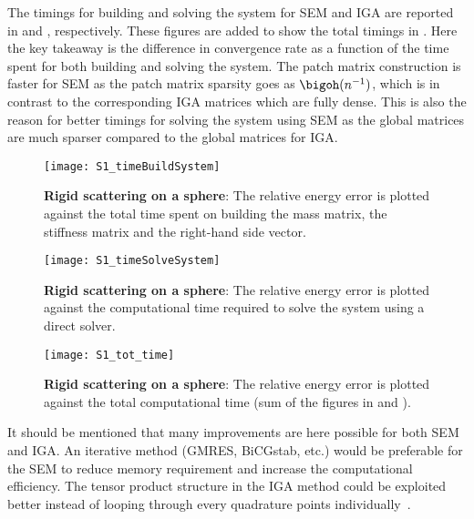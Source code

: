 The timings for building and solving the system for SEM and IGA are reported in  and , respectively. These figures are added to show the total timings in . Here the key takeaway is the difference in convergence rate as a function of the time spent for both building and solving the system. The patch matrix construction is faster for SEM as the patch matrix sparsity goes as $\bigoh(n^{-1})$, which is in contrast to the corresponding IGA matrices which are fully dense. This is also the reason for better timings for solving the system using SEM as the global matrices are much sparser compared to the global matrices for IGA.
\begin{figure}
	\centering
	\texttt{[image: S1\_timeBuildSystem]}
	\caption{\textbf{Rigid scattering on a sphere}: The relative energy error is plotted against the total time spent on building the mass matrix, the stiffness matrix and the right-hand side vector.}
	\label{Fig5:S1_timeBuildSystem}
\end{figure}
\begin{figure}
	\centering
	\texttt{[image: S1\_timeSolveSystem]}
	\caption{\textbf{Rigid scattering on a sphere}: The relative energy error is plotted against the computational time required to solve the system using a direct solver.}
	\label{Fig5:S1_timeSolveSystem}
\end{figure}
\begin{figure}
	\centering
	\texttt{[image: S1\_tot\_time]}
	\caption{\textbf{Rigid scattering on a sphere}: The relative energy error is plotted against the total computational time (sum of the figures in  and ).}
	\label{Fig5:S1_tot_time}
\end{figure}

It should be mentioned that many improvements are here possible for both SEM and IGA. An iterative method (GMRES, BiCGstab, etc.) would be preferable for the SEM to reduce memory requirement and increase the computational efficiency. The tensor product structure in the IGA method could be exploited better instead of looping through every quadrature points individually~\cite{Antolin2015emc}.